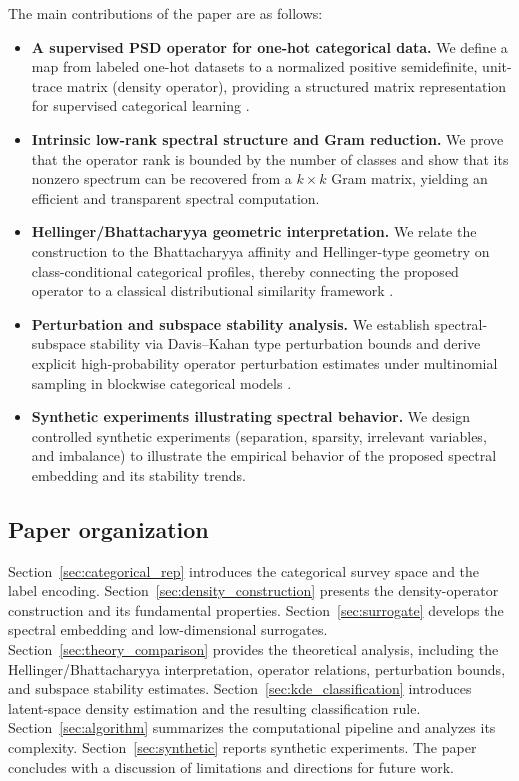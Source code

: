 \documentclass[preprint,11pt]{elsarticle}
\begin{document}
The main contributions of the paper are as follows:
\begin{itemize}
  \item \textbf{A supervised PSD operator for one-hot categorical data.}
  We define a map from labeled one-hot datasets to a normalized positive semidefinite, unit-trace matrix (density operator), providing a structured matrix representation for supervised categorical learning \cite{NielsenChuang2000,Holevo2001}.

  \item \textbf{Intrinsic low-rank spectral structure and Gram reduction.}
  We prove that the operator rank is bounded by the number of classes and show that its nonzero spectrum can be recovered from a $k\times k$ Gram matrix, yielding an efficient and transparent spectral computation.

  \item \textbf{Hellinger/Bhattacharyya geometric interpretation.}
  We relate the construction to the Bhattacharyya affinity and Hellinger-type geometry on class-conditional categorical profiles, thereby connecting the proposed operator to a classical distributional similarity framework \cite{Bhattacharyya1943,Aherne1998}.

  \item \textbf{Perturbation and subspace stability analysis.}
  We establish spectral-subspace stability via Davis--Kahan type perturbation bounds and derive explicit high-probability operator perturbation estimates under multinomial sampling in blockwise categorical models \cite{DavisKahan1970,YuWangSamworth2015}.

  \item \textbf{Synthetic experiments illustrating spectral behavior.}
  We design controlled synthetic experiments (separation, sparsity, irrelevant variables, and imbalance) to illustrate the empirical behavior of the proposed spectral embedding and its stability trends.
\end{itemize}

\subsection{Paper organization}

Section~\ref{sec:categorical_rep} introduces the categorical survey space and the label encoding.
Section~\ref{sec:density_construction} presents the density-operator construction and its fundamental properties.
Section~\ref{sec:surrogate} develops the spectral embedding and low-dimensional surrogates.
Section~\ref{sec:theory_comparison} provides the theoretical analysis, including the Hellinger/Bhattacharyya interpretation, operator relations, perturbation bounds, and subspace stability estimates.
Section~\ref{sec:kde_classification} introduces latent-space density estimation and the resulting classification rule.
Section~\ref{sec:algorithm} summarizes the computational pipeline and analyzes its complexity.
Section~\ref{sec:synthetic} reports synthetic experiments.
The paper concludes with a discussion of limitations and directions for future work.
\end{document}
